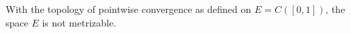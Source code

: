 With the topology of pointwise convergence as defined on $E = C([0,1])$, the space $E$ is not metrizable.
